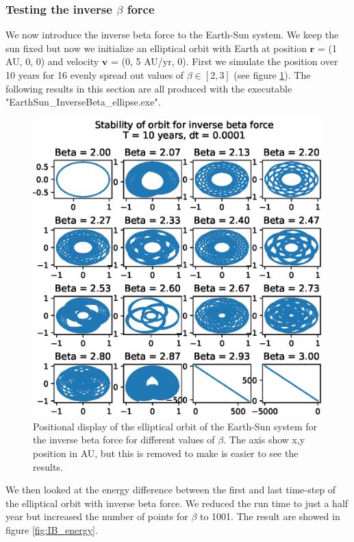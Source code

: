 \documentclass[american,a4paper,12pt]{article}
\renewcommand{\vec}[1]{\mathbf{#1}} %
\begin{document}
\subsubsection{Testing the inverse $\beta$ force}
We now introduce the inverse beta force to the Earth-Sun system. We keep the sun fixed but now we initialize an elliptical orbit with Earth at position $\vec{r}$ = (1 AU, 0, 0) and velocity $\vec{v}$ = (0, 5 AU/yr, 0). First we simulate the position over 10 years for 16 evenly spread out values of $\beta \in [2,3]$ (see figure \ref{fig:IB_pos}). The following results in this section are all produced with the executable "EarthSun\_InverseBeta\_ellipse.exe".
\begin{figure}[H]
    \centering
    \includegraphics[width = \textwidth]{figures/EarthSun_InverseBeta_pos.eps}
    \caption{Positional display of the elliptical orbit of the Earth-Sun system for the inverse beta force for different values of $\beta$. The axis show x,y position in AU, but this is removed to make is easier to see the results.}
    \label{fig:IB_pos}
\end{figure}
We then looked at the energy difference between the first and last time-step of the elliptical orbit with inverse beta force. We reduced the run time to just a half year but increased the number of points for $\beta$ to 1001. The result are showed in figure \ref{fig:IB_energy}.
\end{document}
